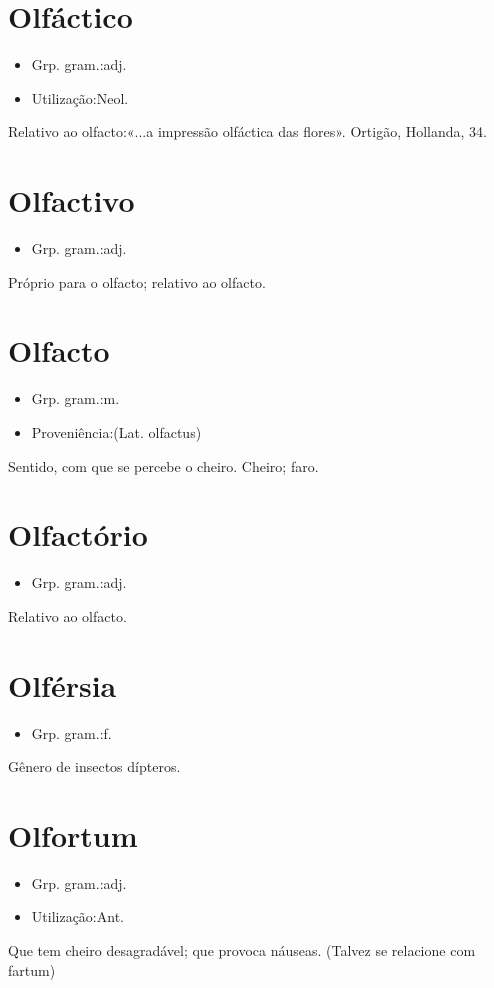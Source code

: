 \section{Olfáctico}
\begin{itemize}
\item {Grp. gram.:adj.}
\end{itemize}
\begin{itemize}
\item {Utilização:Neol.}
\end{itemize}
Relativo ao olfacto:«\textunderscore ...a impressão olfáctica das flores\textunderscore ». Ortigão, \textunderscore Hollanda\textunderscore , 34.
\section{Olfactivo}
\begin{itemize}
\item {Grp. gram.:adj.}
\end{itemize}
Próprio para o olfacto; relativo ao olfacto.
\section{Olfacto}
\begin{itemize}
\item {Grp. gram.:m.}
\end{itemize}
\begin{itemize}
\item {Proveniência:(Lat. \textunderscore olfactus\textunderscore )}
\end{itemize}
Sentido, com que se percebe o cheiro.
Cheiro; faro.
\section{Olfactório}
\begin{itemize}
\item {Grp. gram.:adj.}
\end{itemize}
Relativo ao olfacto.
\section{Olférsia}
\begin{itemize}
\item {Grp. gram.:f.}
\end{itemize}
Gênero de insectos dípteros.
\section{Olfortum}
\begin{itemize}
\item {Grp. gram.:adj.}
\end{itemize}
\begin{itemize}
\item {Utilização:Ant.}
\end{itemize}
Que tem cheiro desagradável; que provoca náuseas.
(Talvez se relacione com \textunderscore fartum\textunderscore )

